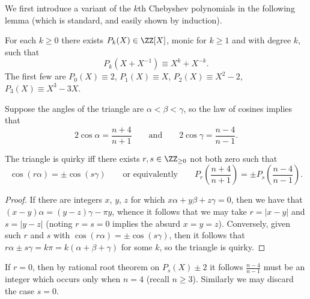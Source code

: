 \documentclass[11pt]{scrartcl}
\begin{document}
We first introduce a variant of the $k$th Chebyshev polynomials
in the following lemma
(which is standard, and easily shown by induction).
\begin{lemma*}
  For each $k \ge 0$ there exists $P_k(X) \in \ZZ[X]$,
  monic for $k \ge 1$ and with degree $k$, such that
  \[ P_k( X + X^{-1} ) \equiv X^k + X^{-k}. \]
  The first few are $P_0(X) \equiv 2$,
  $P_1(X) \equiv X$, $P_2(X) \equiv X^2-2$, $P_3(X) \equiv X^3-3X$.
\end{lemma*}
Suppose the angles of the triangle are $\alpha < \beta < \gamma$,
so the law of cosines implies that
\[ 2\cos\alpha =\frac{n+4}{n+1} \qquad \text{and} \qquad 2\cos\gamma = \frac{n-4}{n-1}. \]
\begin{claim*}
  The triangle is quirky iff there exists $r,s \in \ZZ_{\ge0}$ not both zero such that
  \[ \cos(r\alpha) = \pm \cos(s\gamma)
    \qquad \text{or equivalently} \qquad
    P_r\left( \frac{n+4}{n+1} \right) = \pm P_s\left( \frac{n-4}{n-1} \right). \]
\end{claim*}
\begin{proof}
If there are integers $x$, $y$, $z$ for which $x\alpha + y\beta + z\gamma = 0$,
then we have that $(x-y)\alpha = (y-z)\gamma - \pi y$,
whence it follows that we may take $r = |x-y|$ and $s = |y-z|$
(noting $r=s=0$ implies the absurd $x=y=z$).
Conversely, given such $r$ and $s$ with $\cos(r\alpha) = \pm \cos(s\gamma)$,
then it follows that $r \alpha \pm s \gamma = k\pi = k(\alpha + \beta + \gamma)$
for some $k$, so the triangle is quirky.
\end{proof}

If $r=0$, then by rational root theorem on $P_s(X) \pm 2$ it follows
$\frac{n-4}{n-1}$ must be an integer which occurs only when $n = 4$ (recall $n \ge 3$).
Similarly we may discard the case $s = 0$.
\end{document}
